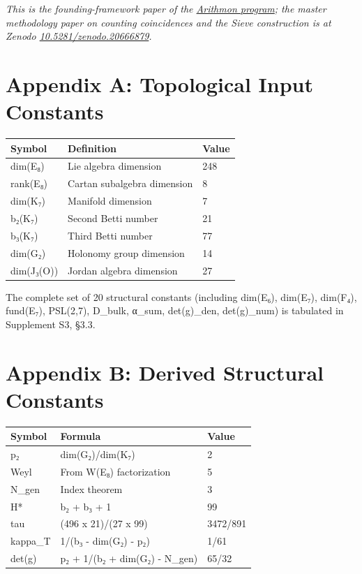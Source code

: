 \documentclass[11pt,a4paper]{article}
\begin{document}
\emph{This is the founding-framework paper of the \href{https://arithmon.com}{Arithmon program}; the master methodology paper on counting coincidences and the Sieve construction is at Zenodo \href{https://doi.org/10.5281/zenodo.20666879}{10.5281/zenodo.20666879}.}

\section{Appendix A: Topological Input Constants}\label{appendix-a-topological-input-constants}

\begin{longtable}[]{@{}lll@{}}
\toprule\noalign{}
Symbol & Definition & Value \\
\midrule\noalign{}
\endhead
\bottomrule\noalign{}
\endlastfoot
dim(E₈) & Lie algebra dimension & 248 \\
rank(E₈) & Cartan subalgebra dimension & 8 \\
dim(K₇) & Manifold dimension & 7 \\
b₂(K₇) & Second Betti number & 21 \\
b₃(K₇) & Third Betti number & 77 \\
dim(G₂) & Holonomy group dimension & 14 \\
dim(J₃(O)) & Jordan algebra dimension & 27 \\
\end{longtable}

The complete set of 20 structural constants (including dim(E₆), dim(E₇), dim(F₄), fund(E₇), \textbar PSL(2,7)\textbar, D\_\allowbreak{}bulk, α\_\allowbreak{}sum, det(g)\_\allowbreak{}den, det(g)\_\allowbreak{}num) is tabulated in Supplement S3, §3.3.

\section{Appendix B: Derived Structural Constants}\label{appendix-b-derived-structural-constants}

\begin{longtable}[]{@{}lll@{}}
\toprule\noalign{}
Symbol & Formula & Value \\
\midrule\noalign{}
\endhead
\bottomrule\noalign{}
\endlastfoot
p₂ & dim(G₂)/dim(K₇) & 2 \\
Weyl & From W(E₈) factorization & 5 \\
N\_\allowbreak{}gen & Index theorem & 3 \\
H* & b₂ + b₃ + 1 & 99 \\
tau & (496 x 21)/(27 x 99) & 3472/891 \\
kappa\_\allowbreak{}T & 1/(b₃ - dim(G₂) - p₂) & 1/61 \\
det(g) & p₂ + 1/(b₂ + dim(G₂) - N\_\allowbreak{}gen) & 65/32 \\
\end{longtable}
\end{document}
